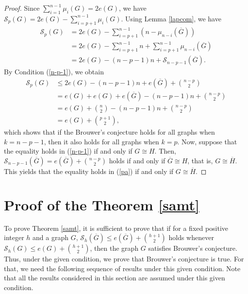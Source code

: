 \documentclass[12pt]{article}
\theoremstyle{plain}
\theoremstyle{definition}
\begin{document}
\begin{proof}
	Since $\sum_{i=1}^{n-1}\mu_i(G)=2e(G)$, we have $\mathcal{S}_{p}(G)=2e(G)-\sum_{i=p+1}^{n-1}\mu_i(G).$
	Using Lemma \ref{lapcom}, we have 
	\begin{align*}
		\mathcal{S}_{p}(G)
		&=2e(G)-\sum_{i=p+1}^{n-1}\left(n-\mu_{n-i}(\overline{G})\right) \quad \\
		&=2e(G)-\sum_{i=p+1}^{n-1}n+\sum_{i=p+1}^{n-1} \mu_{n-i}(\overline{G})\\
		&=2e(G)-(n-p-1)n+\mathcal{S}_{n-p-1}(\overline{G}).
	\end{align*}
	By Condition (\ref{n-p-1}), we obtain
	\begin{align*}
		\mathcal{S}_{p}(G)
		&\leq 2e(G)-(n-p-1)n+e(\overline{G})+\binom{n-p}{2}\\
		&=e(G)+e(G)+e(\overline{G})-(n-p-1)n+\binom{n-p}{2}\\
		&=e(G)+\binom{n}{2}-(n-p-1) n+\binom{n-p}{2}\\
		&=e(G)+\binom{p+1}{2},
	\end{align*}
	which shows that if the Brouwer's conjecture holds for all graphs when  $k=n-p-1$, then it also holds for all graphs when $k=p$. Now, suppose  that the equality holds in (\ref{n-p-1}) if and only if $G\cong H$. Then, $\mathcal{S}_{n-p-1}(\overline{G})= e(\overline{G})+\binom{n-p}{2}$ holds if and only if $\overline{G}\cong H$, that is, $G\cong \overline{H}$. This yields that the equality holds in (\ref{pa}) if and only if $G \cong \overline{H}$.
\end{proof}
\section{Proof of the Theorem \ref{samt}}\label{sec4}
 

To prove Theorem \ref{samt}, it is sufficient to prove that if for a fixed positive integer $h$ and a graph $G$, $\mathcal{S}_h(\overline{G})\leq e(\overline{G})+\binom{h+1}{2}$ holds whenever $\mathcal{S}_h(G)\leq e(G)+\binom{h+1}{2}$, then the graph $G$ satisfies Brouwer’s conjecture. Thus, under the given condition, we prove that Brouwer's conjecture is true. For that, we need the following sequence of results under this given condition. Note that all the results considered in this section are assumed under this given condition.
\end{document}
